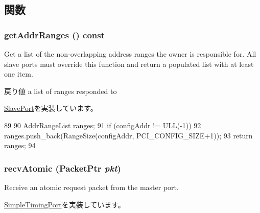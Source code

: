 \subsection{関数}
\hypertarget{classPciDevice_1_1PciConfigPort_a36cf113d5e5e091ebddb32306c098fae}{
\subsubsection[{getAddrRanges}]{ getAddrRanges () const}}
\label{classPciDevice_1_1PciConfigPort_a36cf113d5e5e091ebddb32306c098fae}
Get a list of the non-\/overlapping address ranges the owner is responsible for. All slave ports must override this function and return a populated list with at least one item.

\begin{DoxyReturn}{戻り値}
a list of ranges responded to 
\end{DoxyReturn}


\hyperlink{classSlavePort_a6e967f8921e80748eb2be35b6b481a7e}{SlavePort}を実装しています。


\begin{DoxyCode}
89 {
90     AddrRangeList ranges;
91     if (configAddr != ULL(-1))
92         ranges.push_back(RangeSize(configAddr, PCI_CONFIG_SIZE+1));
93     return ranges;
94 }
\end{DoxyCode}
\hypertarget{classPciDevice_1_1PciConfigPort_a5f0b4c4a94f6b0053f9d7a4eb9c2518a}{
\subsubsection[{recvAtomic}]{ recvAtomic ({\bf PacketPtr} {\em pkt})}}
\label{classPciDevice_1_1PciConfigPort_a5f0b4c4a94f6b0053f9d7a4eb9c2518a}
Receive an atomic request packet from the master port. 

\hyperlink{classSimpleTimingPort_a428ab07671bc9372dc44a2487b12a726}{SimpleTimingPort}を実装しています。


